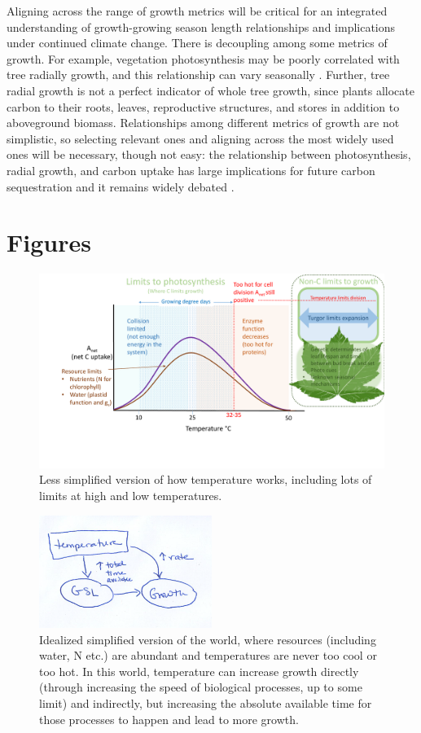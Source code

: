 \documentclass[11pt]{article}
\begin{document}
Aligning across the range of growth metrics will be critical for an integrated understanding of growth-growing season length relationships and implications under continued climate change.  There is decoupling among some metrics of growth. For example, vegetation photosynthesis may be poorly correlated with tree radially growth, and this relationship can vary seasonally \citep{cabon2022cross}. Further, tree radial growth is not a perfect indicator of whole tree growth, since plants allocate
carbon to their roots, leaves, reproductive structures, and stores in addition to aboveground biomass. Relationships among different metrics of growth are not simplistic, so selecting relevant ones and aligning across the most widely used ones will be necessary, though not easy: the relationship  between photosynthesis, radial growth, and carbon uptake has large implications for future carbon sequestration and it remains widely debated \citep{green2022limits}.


\newpage
\section{Figures}
\begin{figure}[h!]
\includegraphics[width=1\textwidth]{..//figures/grephonfig.pdf}
\caption{Less simplified version of how temperature works, including lots of limits at high and low temperatures.}
\label{fig:temperaturecomplex}
\end{figure}


\begin{figure}[h!]
\includegraphics[width=0.5\textwidth]{..//figures/gsltogrowth/gsltogrowth_emw1a.png}
\caption{Idealized simplified version of the world, where resources (including water, N etc.) are abundant and temperatures are never too cool or too hot. In this world, temperature can increase growth directly (through increasing the speed of biological processes, up to some limit) and indirectly, but increasing the absolute available time for those processes to happen and lead to more growth.}
\label{fig:concepbiotime}
\end{figure}
\end{document}
